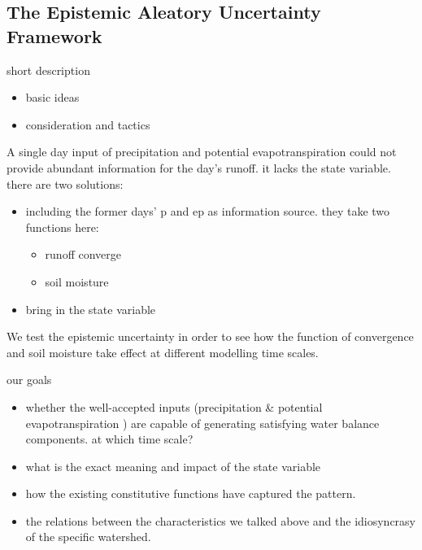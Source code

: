 \newpage
\begin{center}
\section{The Epistemic  Aleatory Uncertainty Framework} 
\end{center}

short description
\begin{itemize}
\item basic ideas
\item consideration and tactics
\end{itemize}


A single day input of precipitation and potential evapotranspiration could not provide abundant information for the day's runoff. it lacks the state variable.
there are two solutions:
\begin{itemize}
\item including the former days' p and ep as information source. they take two functions here:
\begin{itemize}
\item runoff converge
\item soil moisture
\end{itemize}
\item bring in the state variable
\end{itemize}

We test the epistemic uncertainty in order to see how the function of convergence and soil moisture take effect at different modelling time scales.









our goals
\begin{itemize}
\item whether the well-accepted inputs (precipitation \& potential evapotranspiration ) are capable of generating satisfying water balance components. at which time scale?
\item what is the exact meaning and impact of the state variable
\item how the existing constitutive functions have captured the pattern.
\item the relations between the characteristics we talked above and the idiosyncrasy of the specific watershed.
\end{itemize}
{}

